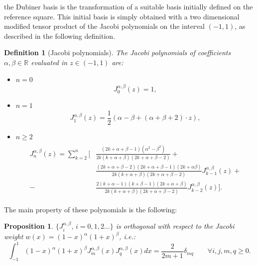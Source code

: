 \documentclass[a4paper,11pt]{article}
\newtheorem{definition}{Definition}
\newtheorem{prop}{Proposition}
\begin{document}
    \noindent the Dubiner basis is the transformation of a suitable basis initially defined on the reference square. This initial basis is simply obtained with a two dimensional modified tensor product of the Jacobi polynomials on the interval $(-1,1)$, as described in the following definition. \\

    \begin{definition}[Jacobi polynomials]\label{jacobi}
    The Jacobi polynomials of coefficients $\alpha,\beta \in \mathbb{R}$ evaluated in $z\in (-1,1)$ are:
    \begin{itemize}[label=\textendash]
    \item $n=0$
    \begin{equation*}
    J_0^{\alpha,\beta}(z)=1,
    \end{equation*}
    \item $n=1$
    \begin{equation*}
    J_1^{\alpha,\beta}(z)=\frac{1}{2}(\alpha-\beta+(\alpha+\beta+2)\cdot z),
    \end{equation*}
    \item $n\ge2$
    \newline
    \begin{equation*}
    \begin{gathered}
    \begin{aligned}
    J_n^{\alpha,\beta}(z)=\sum_{k=2}^{n} \Big[&\frac{(2k+\alpha+\beta-1)(\alpha^{2}-\beta^{2})}{2k(k+\alpha+\beta)(2k+\alpha+\beta-2)}+ \\ &\frac{(2k+\alpha+\beta-2)(2k+\alpha+\beta-1)(2k+\alpha \beta)}{2k(k+\alpha+\beta)(2k+\alpha+\beta-2)} J_{k-1}^{\alpha,\beta}(z) +
    \\-&\frac{2(k+\alpha-1)(k+\beta-1)(2k+\alpha+\beta)}{2k(k+\alpha+\beta)(2k+\alpha+\beta-2)} J_{k-2}^{\alpha,\beta}(z) \Big].
    \end{aligned}
    \end{gathered}
    \end{equation*}
    \end{itemize}
    \end{definition}
    \vspace{5mm}
    \noindent The main property of these polynomials is the following:
    \begin{prop}\label{prop1}
    $\{J_i^{\alpha,\beta}, \, i=0,1,2 \dots\}$ is orthogonal with respect to the Jacobi weight $w(x)=(1-x)^\alpha(1+x)^\beta$, i.e.:
    \begin{equation*}
    \int_{-1}^{1}{(1-x)^\alpha(1+x)^\beta J_m^{\alpha,\beta}(x) J_q^{\alpha,\beta}(x)dx}=\frac{2}{2m+1} \delta_{mq} \qquad \forall i,j,m,q \geq 0.
    \end{equation*}
    \end{prop}
    
\end{document}
